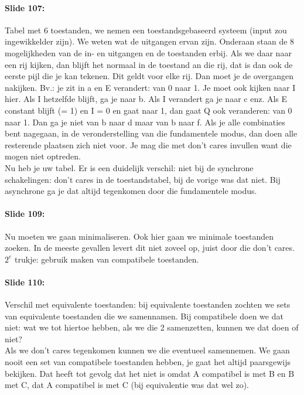 \documentclass[10pt,a4paper]{book}
\begin{document}
\paragraph{Slide 107:} Tabel met 6 toestanden, we nemen een toestandsgebaseerd systeem (input zou ingewikkelder zijn). We weten wat de uitgangen ervan zijn. Onderaan staan de 8 mogelijkheden van de in- en uitgangen en de toestanden erbij. Als we daar naar een rij kijken, dan blijft het normaal in de toestand an die rij, dat is dan ook de eerste pijl die je kan tekenen. Dit geldt voor elke rij. Dan moet je de overgangen nakijken. Bv.: je zit in a en E verandert: van 0 naar 1. Je moet ook kijken naar I hier. Als I hetzelfde blijft, ga je naar b. Als I verandert ga je naar c enz. Als E constant blijft (= 1) en I = 0 en gaat naar 1, dan gaat Q ook veranderen: van 0 naar 1. Dan ga je niet van b naar d maar van b naar f. Als je alle combinaties bent nagegaan, in de veronderstelling van die fundamentele modus, dan doen alle resterende plaatsen zich niet voor. Je mag die met don't cares invullen want die mogen niet optreden.\\
Nu heb je uw tabel. Er is een duidelijk verschil: niet bij de synchrone schakelingen: don't cares in de toestandstabel, bij de vorige was dat niet. Bij asynchrone ga je dat altijd tegenkomen door die fundamentele modus.

\paragraph{Slide 109:} Nu moeten we gaan minimaliseren. Ook hier gaan we minimale toestanden zoeken. In de meeste gevallen levert dit niet zoveel op, juist door die don't cares. $2^e$ trukje: gebruik maken van compatibele toestanden. 

\paragraph{Slide 110:} Verschil met equivalente toestanden: bij equivalente toestanden zochten we sets van equivalente toestanden die we samennamen. Bij compatibele doen we dat niet: wat we tot hiertoe hebben, als we die 2 samenzetten, kunnen we dat doen of niet?\\
Als we don't cares tegenkomen kunnen we die eventueel samennemen. We gaan nooit een set van compatibele toestanden hebben, je gaat het altijd paarsgewijs bekijken. Dat heeft tot gevolg dat het niet is omdat A compatibel is met B en B met C, dat A compatibel is met C (bij equivalentie was dat wel zo).
\end{document}

